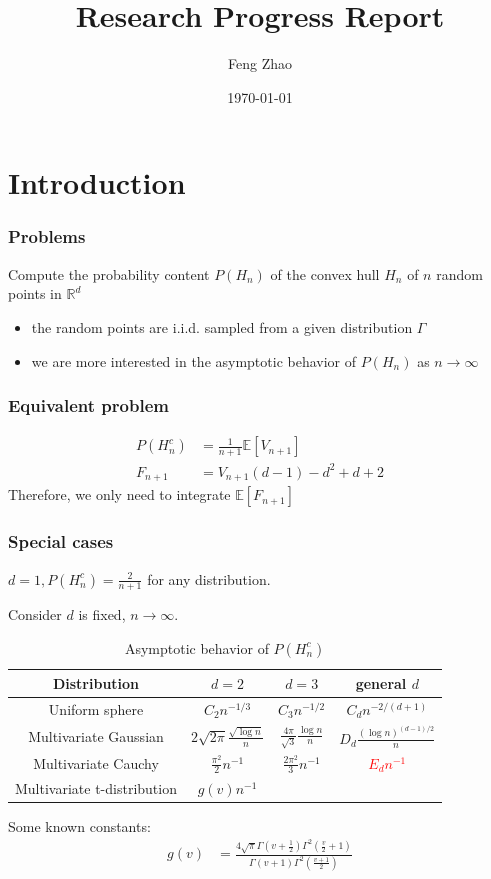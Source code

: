 \documentclass{beamer}
\title{Research Progress Report}
\author{Feng Zhao}
\date{\today}
\begin{document}
\begin{frame}
	\titlepage
\end{frame}


\section{Introduction}

\begin{frame}
\frametitle{Problems}
Compute the probability content $P(H_n)$ of the convex hull $H_n$
of $n$ random points in $\mathbb{R}^d$
\begin{itemize}
\item the random points are i.i.d. sampled from a given distribution $\Gamma$
\item we are more interested in the asymptotic behavior of $P(H_n)$
as $n\to\infty$
\end{itemize}
\end{frame}
\begin{frame}
	\frametitle{Equivalent problem}
    \begin{align}
        P(H_n^c) & = \frac{1}{n+1}\mathbb{E}[V_{n+1}]\\
        F_{n+1} & = V_{n+1} (d-1) - d^2 + d + 2
    \end{align}   
    Therefore, we only need to integrate
    $\mathbb{E}[F_{n+1}]$
\end{frame}   
\begin{frame}
    \frametitle{Special cases}
    $d=1,P(H_n^c) = \frac{2}{n+1}$ for any distribution.
    
    Consider $d$ is fixed, $n\to \infty$.
    \begin{table}
        \begin{tabular}{|c|c|c|c|}
            \hline
            Distribution & $d=2$ & $d=3$ &  general $d$ \\
            \hline
            Uniform sphere & $C_2 n^{-1/3}$ & $C_3 n^{-1/2}$ &
            $C_{d} n^{-2/(d+1)}$ \\
            \hline
            Multivariate Gaussian &
            $2\sqrt{2\pi}\frac{\sqrt{\log n}}{n}$
            & $\frac{4\pi}{\sqrt{3}}\frac{\log n}{n}$ & $D_d\frac{(\log n)^{(d-1)/2}}{n}$ \\
            \hline
            Multivariate Cauchy & 
            $\frac{\pi^2}{2}n^{-1}$ &
            $\frac{2\pi^2}{3}n^{-1}$ &
            \textcolor{red}{$E_d n^{-1}$}\\
            \hline
            Multivariate t-distribution &
            $g(v) n^{-1}$ & & \\
            \hline
        \end{tabular}
        \caption{Asymptotic behavior of $P(H_n^c)$}
    \end{table}
    Some known constants:
    \begin{align*}
    g(v) &= \frac{4\sqrt{\pi}
    \Gamma(v+\frac{1}{2})\Gamma^2\left(\frac{v}{2}+1\right)}
    {\Gamma(v+1)\Gamma^2 \left(\frac{v+1}{2} \right)}
    \end{align*}
\end{frame}
\end{document}
